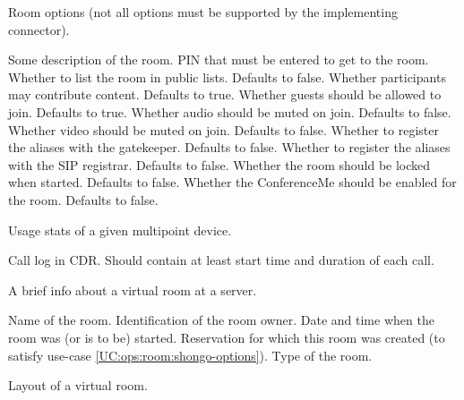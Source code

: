 \begin{Api}
Room options (not all options must be supported by the implementing connector).
\begin{ApiEnumValues}
 Some description of the room.
 PIN that must be entered to get to the room.
 Whether to list the room in public lists. Defaults to false.
 Whether participants may contribute content. Defaults to true.
 Whether guests should be allowed to join. Defaults to true.
 Whether audio should be muted on join. Defaults to false.
 Whether video should be muted on join. Defaults to false.
 Whether to register the aliases with the gatekeeper. Defaults to false.
 Whether to register the aliases with the SIP registrar. Defaults to false.
 Whether the room should be locked when started. Defaults to false.
 Whether the ConferenceMe should be enabled for the room. Defaults to false.
\end{ApiEnumValues}

Usage stats of a given multipoint device.
\begin{ApiClassAttributes}
 Call log in CDR. Should contain at least start time and duration of each call.
\end{ApiClassAttributes}

A brief info about a virtual room at a server.
\begin{ApiClassAttributes}
 Name of the room.
 Identification of the room owner.
 Date and time when the room was (or is to be) started.
 Reservation for which this room was created (to satisfy use-case \ref{UC:ops:room:shongo-options}).
 Type of the room.
\end{ApiClassAttributes}

Layout of a virtual room.
\begin{ApiEnumValues}
\end{ApiEnumValues}


\end{Api}
